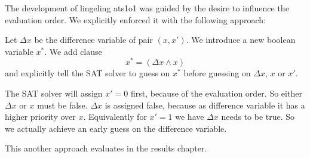 The development of lingeling ats1o1 was guided by the desire to influence the evaluation
order. We explicitly enforced it with the following approach:

Let $\Delta x$ be the difference variable of pair $(x, x')$. We introduce a new boolean
variable $x^*$. We add clause
\[ x^* = (\Delta x \land x) \]
and explicitly tell the SAT solver to guess on $x^*$ before guessing on $\Delta x$, $x$ or $x'$.

The SAT solver will assign $x'=0$ first, because of the evaluation order. So either $\Delta x$
or $x$ must be false. $\Delta x$ is assigned false, because as difference variable it has a higher
priority over $x$. Equivalently for $x'=1$ we have $\Delta x$ needs to be true. So we actually
achieve an early guess on the difference variable.

This another approach evaluates in the results chapter.
